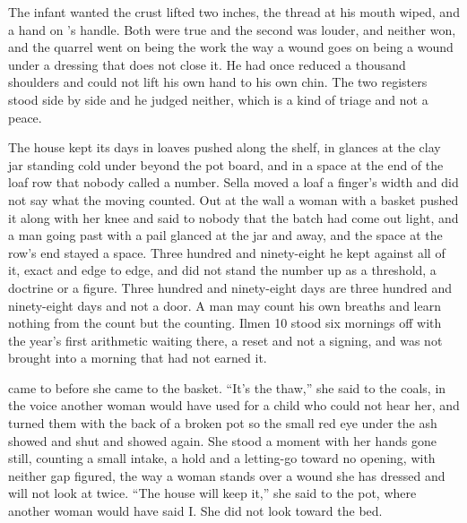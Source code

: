 The infant wanted the crust lifted two inches, the thread at his mouth wiped, and a hand on 's handle. Both were true and the second was louder, and neither won, and the quarrel went on being the work the way a wound goes on being a wound under a dressing that does not close it. He had once reduced a thousand shoulders and could not lift his own hand to his own chin. The two registers stood side by side and he judged neither, which is a kind of triage and not a peace.

The house kept its days in loaves pushed along the shelf, in glances at the clay jar standing cold under  beyond the pot board, and in a space at the end of the loaf row that nobody called a number. Sella moved a loaf a finger's width and did not say what the moving counted. Out at the wall a woman with a basket pushed it along with her knee and said to nobody that the batch had come out light, and a man going past with a pail glanced at the jar and away, and the space at the row's end stayed a space. Three hundred and ninety-eight he kept against all of it, exact and edge to edge, and did not stand the number up as a threshold, a doctrine or a figure. Three hundred and ninety-eight days are three hundred and ninety-eight days and not a door. A man may count his own breaths and learn nothing from the count but the counting. Ilmen 10 stood six mornings off with the year's first arithmetic waiting there, a reset and not a signing, and was not brought into a morning that had not earned it.

\scenebreak

 came to  before she came to the basket. “It's the thaw,” she said to the coals, in the voice another woman would have used for a child who could not hear her, and turned them with the back of a broken pot so the small red eye under the ash showed and shut and showed again. She stood a moment with her hands gone still, counting a small intake, a hold and a letting-go toward no opening, with neither gap figured, the way a woman stands over a wound she has dressed and will not look at twice. “The house will keep it,” she said to the pot, where another woman would have said I. She did not look toward the bed.

